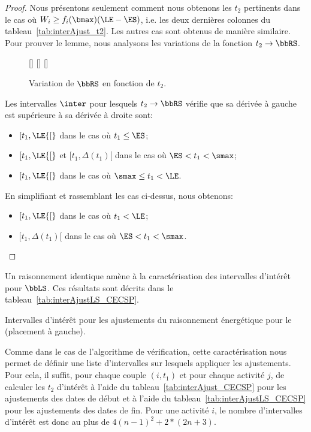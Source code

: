 \begin{proof}
  Nous présentons seulement comment nous obtenons les $t_2$ pertinents
dans le cas où $W_i \ge f_i(\bmax)(\LE - \ES)$, i.e. les deux dernières
colonnes du tableau~\ref{tab:interAjust_t2}. Les autres cas sont
obtenus de manière similaire. Pour prouver le lemme, nous analysons
les variations de la fonction $t_2 \rightarrow \bbRS$.


\begin{figure}[!htb]
 [\linewidth] {
    }
 [\linewidth]{
  }
 [\linewidth]
{}
\caption{Variation de $\bbRS$ en fonction de $t_2$.}
\end{figure}


Les intervalles $\inter$ pour lesquels $t_2 \rightarrow \bbRS$ vérifie
que sa dérivée à gauche est supérieure à sa dérivée à droite sont:
\begin{itemize}
\item $[t_1, \LE {[}$ dans le cas où $t_1 \le \ES$;
\item $[t_1, \LE {[}$ et $[t_1, \Delta(t_1) [$ dans le cas où $\ES <
  t_1 < \smax$;
\item $[t_1, \LE {[}$ dans le cas où $\smax \le t_1 < \LE$.
\end{itemize}
En simplifiant et rassemblant les cas ci-dessus, nous obtenons: \begin{itemize}
\item $[t_1, \LE {[}$ dans le cas où $t_1 < \LE$;
\item $[t_1, \Delta(t_1) [$ dans le cas où $\ES <
  t_1 < \smax$.
\end{itemize}
\end{proof}

Un raisonnement identique amène à la caractérisation des intervalles
d'intérêt pour $\bbLS$. Ces résultats sont décrits dans le
tableau~\ref{tab:interAjustLS_CECSP}.
  \begin{table}[!htb]
  
  \caption{Intervalles d'intérêt pour les ajustements du
    raisonnement énergétique pour le \CECSP (placement à gauche).}
  \label{tab:interAjustLS_CECSP}
\end{table}

Comme dans le cas de l'algorithme de vérification, cette
caractérisation nous permet de définir une liste d'intervalles sur
lesquels appliquer les ajustements. Pour cela, il suffit, pour chaque
couple $(i,t_1)$ et pour chaque activité $j$, de calculer les
$t_2$ d'intérêt à l'aide du tableau~\ref{tab:interAjust_CECSP} pour
les ajustements des dates de début et à l'aide du
tableau~\ref{tab:interAjustLS_CECSP} pour 
les ajustements des dates de fin. Pour une activité $i$, le nombre
d'intervalles d'intérêt est donc au plus de $4(n-1)^2 + 2* (2n+3)$.










